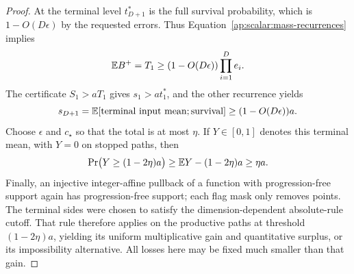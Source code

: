 \begin{proof}
At the terminal level $t_{D+1}^*$ is the full survival probability,
which is $1-O(D\epsilon)$ by the requested errors. Thus
Equation~\eqref{ap:scalar:mass-recurrences} implies
\[
 \mathbb E B^+=T_1\ge(1-O(D\epsilon))\prod_{i=1}^D e_i.
\]
The certificate $S_1>aT_1$ gives $s_1>a t_1^*$, and the other
recurrence yields
\[
 s_{D+1}=\mathbb E[\text{terminal input mean};\text{survival}]
                            \ge(1-O(D\epsilon))a.
\]
Choose $\epsilon$ and $c_\star$ so that the total is at most $\eta$.
If $Y\in[0,1]$ denotes this terminal mean, with $Y=0$ on stopped
paths, then
\[
 \Pr\bigl(Y\ge(1-2\eta)a\bigr)
       \ge \mathbb E Y-(1-2\eta)a\ge\eta a.
\]
Finally, an injective integer-affine pullback of a function with
progression-free support again has progression-free support; each
flag mask only removes points. The terminal sides were chosen to
satisfy the dimension-dependent absolute-rule cutoff. That rule
therefore applies on the productive paths at threshold
$(1-2\eta)a$, yielding its uniform multiplicative gain and quantitative
surplus, or its impossibility alternative. All losses here may be
fixed much smaller than that gain.
\end{proof}

